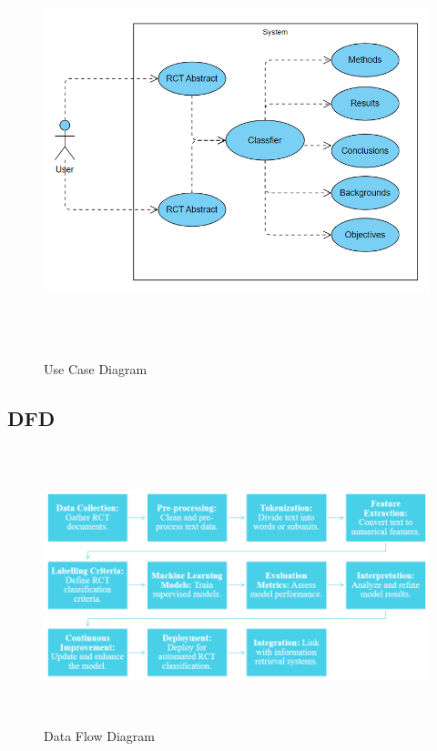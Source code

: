 \documentclass[12pt,a4paper]{report}     %
\begin{document}
\begin{normalsize}
{{\begin{figure}[h]
    \centering
    \includegraphics[width=16cm,height=12cm]{Use Case Diagram.png }
    \caption{Use Case Diagram}
    \label{UCD}
\end{figure}


\subsection{DFD}
\begin{figure}[H]
    \centering
    \includegraphics[width=16cm,height=8cm]{DFD Diagram.png}
    \caption{Data Flow Diagram}
    \label{Data flow diagram}
\end{figure}

}}
\end{normalsize}
\end{document}
